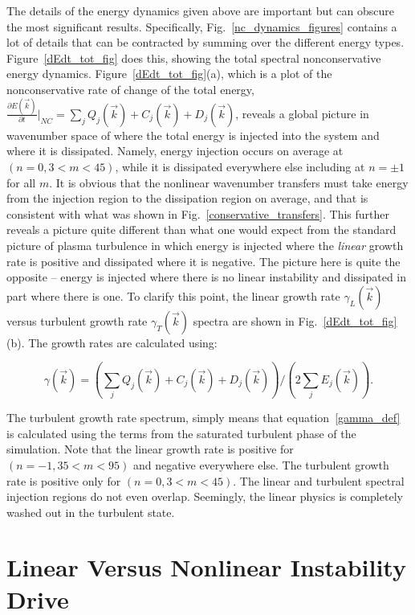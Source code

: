 \documentclass[showpacs,preprintnumbers,amsmath,amssymb,superscriptaddress,aip]{revtex4-1}
\def\beq{\begin{equation}}
\def\eeq{\end{equation}}
\newcommand{\pdiff}[2]{\frac{\partial#1}{\partial#2}}
\begin{document}
The details of the energy dynamics given above are important but can obscure the most significant results. Specifically, Fig.~\ref{nc_dynamics_figures} contains a lot of details
that can be contracted by summing over the different energy types.
Figure~\ref{dEdt_tot_fig} does this, showing the total spectral nonconservative energy dynamics.
Figure~\ref{dEdt_tot_fig}(a), which is a plot of the nonconservative rate of change of the total energy, $ \pdiff{E(\vec{k})}{t} \big|_{NC} = \sum_j Q_j(\vec{k}) + C_j(\vec{k}) + D_j(\vec{k})$, 
reveals a global picture in wavenumber space of
where the total energy is injected into the system and where it is dissipated. Namely, energy injection occurs on average at $(n=0, 3<m<45)$, 
while it is dissipated everywhere else including at $n=\pm 1$ for all $m$. It is obvious that the nonlinear wavenumber transfers must take energy from the injection region to the dissipation
region on average, and that is consistent with what was shown in Fig.~\ref{conservative_transfers}.
This further reveals a picture quite different than what one would expect from the standard picture of plasma turbulence in which energy is 
injected where the \emph{linear} growth rate is positive and dissipated
where it is negative. The picture here is quite the opposite -- energy is injected where there is no linear instability and dissipated in part where there is one.
To clarify this point, the linear growth rate $\gamma_L(\vec{k})$ versus turbulent growth rate $\gamma_{T}(\vec{k})$ spectra are shown in Fig.~\ref{dEdt_tot_fig}(b). 
The growth rates are calculated using:

\beq
\label{gamma_def}
\gamma(\vec{k}) = \left( \sum_j Q_j(\vec{k}) + C_j(\vec{k}) + D_j(\vec{k}) \right)/\left( 2 \sum_j E_j(\vec{k}) \right).
\eeq

The turbulent growth rate spectrum, simply means that equation~\ref{gamma_def} is calculated using the terms from the saturated turbulent phase of the simulation.
Note that the linear growth rate is positive for $(n=-1, 35<m<95)$ and negative everywhere else. The turbulent growth rate is positive only
for $(n=0, 3<m<45)$. The linear and turbulent spectral injection regions do not even overlap. Seemingly, the linear physics is completely washed out in the turbulent state. 


\section{Linear Versus Nonlinear Instability Drive}
\end{document}
